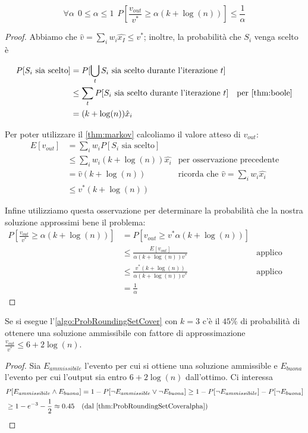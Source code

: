 \begin{theorem} \label{thm:ProbRoundingSetCoveralpha}
	$$\forall \alpha  ~~ 0 \leq \alpha \leq 1 ~~ P[\frac{v_{out}}{v^*}\geq \alpha (k + \log(n))] \leq \frac{1}{\alpha}$$
\end{theorem}
\begin{proof}
	Abbiamo che $\hat{v} = \sum_{i} w_i \hat{x_I} \leq v^*$; inoltre,
	la probabilità che $S_i$ venga scelto è

	\begin{align*}
		P[ S_i \text{ sia scelto}] & = P[ \bigcup_{t} S_i \text{ sia scelto durante l'iterazione } t] 	\\
		& \leq \sum_t P[S_i \text{ sia scelto durante l'iterazione } t] & \text{per \cref{thm:boole}}	\\ 
		& = (k + \log (n))\hat{x}_i
	\end{align*}

	Per poter utilizzare il \cref{thm:markov} calcoliamo il valore atteso di $v_{out}$:
	\begin{align*}
		E[v_{out}] & = \sum_{i} w_i P[S_i \text{ sia scelto}] 							\\
		& \leq \sum_i w_i (k + \log(n)) \hat{x_i} & \text{per osservazione precedente} 	\\
		& = \hat{v} (k + \log(n)) & \text{ricorda che } \hat{v}=\sum_i w_i \hat{x_i} 	\\
		& \leq v^* (k + \log(n))
	\end{align*}

	Infine utilizziamo questa osservazione per determinare la probabilità che
	la nostra soluzione approssimi bene il problema:
	\begin{align*}
		P [ \frac{v_{out}}{v^*} \geq \alpha (k + \log(n))] & = P [ v_{out} \geq v^* \alpha (k + \log(n)) ] 	\\
		& \leq \frac{E[v_{out}]}{\alpha (k + \log(n))v^*} & \text{applico Markov} 							\\
		& \leq \frac{v^* (k + \log(n))}{\alpha (k + \log(n))v^*} & \text{applico l'osservazione precedente}	\\ 
		& = \frac{1}{\alpha}		
	\end{align*}
\end{proof}

\begin{oss}
	Se si esegue l'\cref{algo:ProbRoundingSetCover} con $k = 3$ c'è il $45\%$ di probabilità di ottenere
	una soluzione ammissibile con fattore di approssimazione $\frac{v_{out}}{v^*}\leq 6 + 2 \log (n)$.
\end{oss}
\begin{proof}
	Sia $E_{ammissibile}$ l'evento per cui si ottiene una soluzione ammissible e
	$E_{buona}$ l'evento per cui l'output sia entro $6 + 2 \log(n)$ dall'ottimo.
	Ci interessa
	\begin{align*}
		 & P[E_{ammissibile} \land E_{buona}] = 1 - P[\neg E_{ammissible} \lor
		\neg E_{buona}] \geq 1 - P[\neg E_{ammissibile}] - P[\neg E_{buona}]                                  \\
		 & \geq 1 - e^{-3} - \frac{1}{2} \approx 0.45  ~~~  (\text{dal \cref{thm:ProbRoundingSetCoveralpha}})
	\end{align*}
\end{proof}

